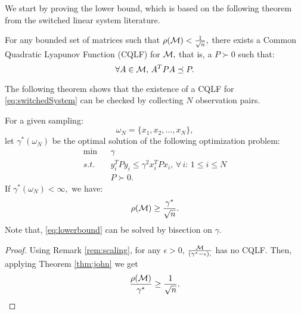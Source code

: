 We start by proving the lower bound, which is based on the following theorem from the switched linear system literature.

\begin{theorem}\cite[Theorem 2.11]{jungers_lncis}\label{thm:john}
For any bounded set of matrices such that $\rho(\mathcal{M})<\frac{1}{\sqrt{n}},$ there exists a Common Quadratic Lyapunov Function (CQLF) for $\mathcal{M},$ that is, a $P\succ 0$ such that: $$\forall A\in \mathcal{M},\, A^TPA\preceq P. $$
\end{theorem}

The following theorem shows that the existence of a CQLF for \eqref{eq:switchedSystem} can be checked by collecting $N$ observation pairs.
%
%


\begin{theorem}
For a given sampling: $$\omega_N = \{x_1, x_2, \ldots, x_N\},$$ let $\gamma^*(\omega_N)$ be the optimal solution of the following optimization problem:
\begin{eqnarray}
\nonumber \mbox{min}&&\gamma\\
 s.t.& & \label{eq:lowerbound}y_i^T P y_i \leq \gamma^2 x_i^TPx_i,\,  \forall \,i : \,1\leq i \leq N\\
\nonumber && P \succ 0.
\end{eqnarray}
If $\gamma^*(\omega_N)<\infty,$ we have:
$$\rho(\mathcal{M}) \geq \frac{\gamma^*}{\sqrt{n}}.$$ Note that, \eqref{eq:lowerbound} can be solved by bisection on $\gamma$.

\end{theorem}
\begin{proof}
Using Remark \ref{rem:scaling}, for any $\epsilon > 0$, $\frac{\mathcal{M}}{(\gamma^*-\epsilon),}$ has no CQLF. Then, applying Theorem \ref{thm:john} we get
\begin{equation*}\frac{\rho(\mathcal{M})}{\gamma^*} \geq \frac{1}{\sqrt{n}}.\end{equation*}
\end{proof}